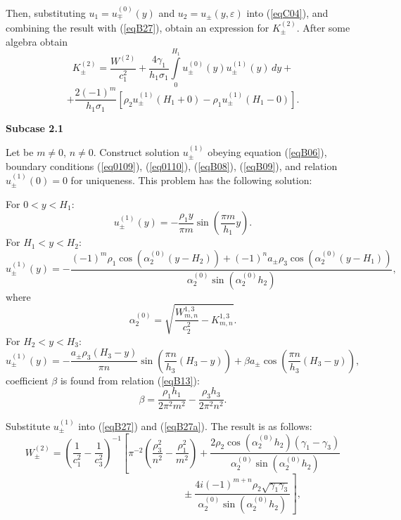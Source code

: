 \documentclass[12pt]{article}
\newcommand{\eps}{\varepsilon}
\begin{document}
Then, substituting 
$u_1 = u^{(0)}_\mp (y)$ and $u_2 = u_\pm (y, \eps)$ into (\ref{eqC04}),
and combining the result with (\ref{eqB27}), obtain
an expression for $K^{(2)}_{\pm}$.
After some algebra obtain
\[
K_\pm^{(2)} = \frac{W^{(2)}}{c_1^2} + 
\frac{4 \gamma_1}{h_1 \sigma_1} \int \limits_0^{H_1} u^{(0)}_\pm (y) u^{(1)}_\pm (y)\, dy + 
\]
\begin{equation}
+\frac{2 (-1)^m}{h_1 \sigma_1} [\rho_2 u^{(1)}_\pm (H_1+0) - \rho_1 u^{(1)}_\pm (H_1 -0)].
\label{eqB27a}
\end{equation}



{\bf  Subcase 2.1}

Let be $m \ne 0$, $n \ne 0$. 
Construct solution $u^{(1)}_\pm$ obeying equation (\ref{eqB06}), boundary conditions 
(\ref{eq0109}), (\ref{eq0110}), (\ref{eqB08}), (\ref{eqB09}), and relation 
$u^{(1)}_\pm (0) =0$ for uniqueness.
This problem has the following solution:

For $0<y<H_1$:
\begin{equation}
u^{(1)}_\pm (y) = - \frac{\rho_1 y}{\pi m} \sin \left( 
\frac{\pi m}{h_1} y
\right).
\label{eqB29}
\end{equation} 
For $H_1 < y < H_2$: 
\begin{equation}
u^{(1)}_\pm (y) =
- \frac{(-1)^m \rho_1 
\cos(\alpha_2^{(0)} (y-H_2))
+
(-1)^n a_\pm \rho_3
\cos(\alpha_2^{(0)} (y-H_1))
}{\alpha_2^{(0)} \sin(\alpha_2^{(0)} h_2)} ,
\label{eqB30}
\end{equation}
where 
\begin{equation}
\alpha_2^{(0)} = \sqrt{\frac{W^{1,3}_{m,n}}{c_2^2} - K^{1,3}_{m,n}} .
\label{eqB30}
\end{equation}
For $H_2 < y < H_3$: 
\begin{equation}
u^{(1)}_\pm (y) = - 
\frac{a_{\pm} \rho_3 (H_3 -y)}{\pi n} \sin \left( 
\frac{\pi n}{h_3} (H_3-y)
\right)
+
\beta a_\pm
\cos \left( 
\frac{\pi n}{h_3} (H_3-y)
\right),
\label{eqB29a}
\end{equation} 
coefficient $\beta$ is found from relation (\ref{eqB13}):
\begin{equation}
\beta = \frac{\rho_1 h_1}{2 \pi^2 m^2} - \frac{\rho_3 h_3}{2 \pi^2 n^2}. 
\label{eqB31}
\end{equation}

Substitute $u^{(1)}_\pm$ into 
(\ref{eqB27}) and (\ref{eqB27a}).
The result is as follows: 
\[
W^{(2)}_\pm = 
\left( \frac{1}{c_1^2} - \frac{1}{c_3^2} \right)^{-1}
\left[
\pi^{-2}
\left( 
\frac{\rho_3^2}{n^2} 
-
\frac{\rho_1^2}{m^2}
\right)
+ 
\frac{2 \rho_2 \cos(\alpha_2^{(0)} h_2) (\gamma_1 -\gamma_3)}{
\alpha_2^{(0)} \sin (\alpha_2^{(0)} h_2)}
\right. 
\]
\begin{equation}
\left.
\qquad \qquad \qquad \qquad \qquad \qquad 
\pm\frac{4 i (-1)^{m+n} \rho_2 \sqrt{\gamma_1 \gamma_3}}{
\alpha_2^{(0)} \sin (\alpha_2^{(0)} h_2)
}
\right],
\label{eqB32}
\end{equation} 
\end{document}
